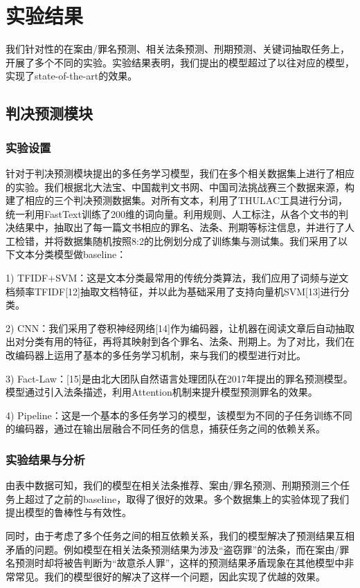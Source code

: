 \chapter{实验结果}
\label{cha:result}

我们针对性的在案由/罪名预测、相关法条预测、刑期预测、关键词抽取任务上，开展了多个不同的实验。实验结果表明，我们提出的模型超过了以往对应的模型，实现了state-of-the-art的效果。

\section{判决预测模块}
\subsection{实验设置}

针对于判决预测模块提出的多任务学习模型，我们在多个相关数据集上进行了相应的实验。我们根据北大法宝、中国裁判文书网、中国司法挑战赛三个数据来源，构建了相应的三个判决预测数据集。对所有文本，利用了THULAC工具进行分词，统一利用FastText训练了200维的词向量。利用规则、人工标注，从各个文书的判决结果中，抽取出了每一篇文书相应的罪名、法条、刑期等标注信息，并进行了人工检错，并将数据集随机按照8:2的比例划分成了训练集与测试集。我们采用了以下文本分类模型做baseline：

1)	TFIDF+SVM：这是文本分类最常用的传统分类算法，我们应用了词频与逆文档频率TFIDF[12]抽取文档特征，并以此为基础采用了支持向量机SVM[13]进行分类。

2)	CNN：我们采用了卷积神经网络[14]作为编码器，让机器在阅读文章后自动抽取出对分类有用的特征，再将其映射到各个罪名、法条、刑期上。为了对比，我们在改编码器上运用了基本的多任务学习机制，来与我们的模型进行对比。

3)	Fact-Law：[15]是由北大团队自然语言处理团队在2017年提出的罪名预测模型。模型通过引入法条描述，利用Attention机制来提升模型预测罪名的效果。

4)	Pipeline：这是一个基本的多任务学习的模型，该模型为不同的子任务训练不同的编码器，通过在输出层融合不同任务的信息，捕获任务之间的依赖关系。

\subsection{实验结果与分析}
由表中数据可知，我们的模型在相关法条推荐、案由/罪名预测、刑期预测三个任务上超过了之前的baseline，取得了很好的效果。多个数据集上的实验体现了我们提出模型的鲁棒性与有效性。

同时，由于考虑了多个任务之间的相互依赖关系，我们的模型解决了预测结果互相矛盾的问题。例如模型在相关法条预测结果为涉及“盗窃罪”的法条，而在案由/罪名预测时却将被告判断为“故意杀人罪”，这样的预测结果矛盾现象在其他模型中非常常见。我们的模型很好的解决了这样一个问题，因此实现了优越的效果。

